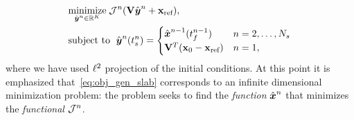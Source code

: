 \begin{equation}\label{eq:obj_gen_slab}
\begin{split}
      & \underset{\hat{\boldsymbol y}^{n} \in \mathbb{R}^{K}}{\text{minimize}}\; \mathcal{J}^n(\mathbf {V} \hat{\boldsymbol y}^{n} + \mathbf{x}_\text{ref}), \\ 
      & \text{subject to }\; \hat{\boldsymbol y}^{n}(t_s^{n}) =
\begin{cases} \hat{ \boldsymbol x}^{n-1}(t_f^{n-1}) & n = 2,\ldots,N_s \\
\mathbf {V}^T( {{\mathbf{x}}_0} - \mathbf{x}_\text{ref}) & n=1, \end{cases} 
\end{split}
\end{equation}
%
where we have used $\ell^2$ projection of the initial conditions. 
At this point it is emphasized that~\eqref{eq:obj_gen_slab} corresponds to
an infinite dimensional minimization problem: the problem seeks to find the
\textit{function} $\hat{ \boldsymbol x}^n$ that minimizes the \textit{functional}
$\mathcal{J}^{n}$.

